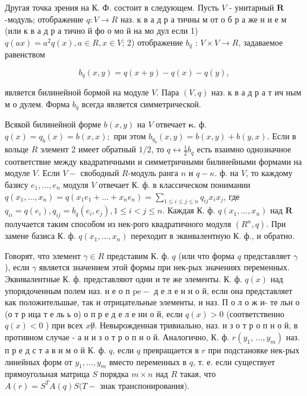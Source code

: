 \documentclass[10pt]{article}
\begin{document}
Другая точка зрения на К. Ф. состоит в следующем. Пусть $V$ - унитарный $\boldsymbol{R}$-модуль; отображение $q: V \rightarrow R$ наз. к в а д р а тичны м от о б р а же н и е м (или к в а д р а тично й фо о мо й на мо дул если 1) $q(a x)=a^{2} q(x), a \in R, x \in V$; 2) отображение $b_{q}$ : $V \times V \rightarrow R$, задаваемое равенством



\[

b_{q}(x, y)=q(x+y)-q(x)-q(y),

\]



является билинейной бормой на модуле $V$. Пара $(V, q)$ наз. к в а д р а т ич ным м о дулем. Форма $b_{q}$ всегда является симметрической.



Всякой билинейной форме $b(x, y)$ на $V$ отвечает $\boldsymbol{\kappa}$. ф. $q(x)=q_{b}(x)=b(x, x) ;$ при этом $b_{q_{b}}(x, y)=b(x, y)+b(y, x)$. Если в кольце $R$ элемент 2 имеет обратный $1 / 2$, то $q \leftrightarrow \frac{1}{2} b_{q}$ есть взаимно однозначное соответствие между квадратичными и симметричными билинейными формами на модуле $V$. Если $V-$ свободный $R$-модуль ранга $n$ и $q-\kappa$. ф. на $V$, то каждому базису $e_{1}, \ldots, e_{n}$ модуля $V$ отвечает К. ф. в классическом понимании $q\left(x_{1}, \ldots, x_{n}\right)=q\left(x_{1} e_{1}+\ldots+x_{n} e_{n}\right)=\sum_{1 \leqslant i \leqslant j \leqslant n} q_{i j} x_{i} x_{j}$, где $q_{i i}=q\left(e_{i}\right), q_{i j}=b_{q}\left(e_{i}, e_{j}\right), 1 \leqslant i<j \leqslant n$. Каждая К. ф. $q\left(x_{1}, \ldots, x_{n}\right)$ над $\boldsymbol{R}$ получается таким способом из нек-рого квадратичного модуля $\left(R^{n}, q\right)$. При замене базиса $К$. ф. $q\left(x_{1}, \ldots, x_{n}\right)$ переходит в эквивалентную К. ф., и обратно.



Говорят, что элемент $\gamma \in R$ представим К. ф. $q$ (или что форма $q$ представляет $\gamma$ ), если $\gamma$ является значением этой формы при нек-рых значениях переменных. Эквивалентные К. ф. представляют одни и те же элементы. К. ф. $q(x)$ над упорядоченным полем наз. н е о п $\mathrm{p} \mathrm{e}-$ д е л е н н о й, если она представляет как положительшые, так и отрицательные элементы, и наз. П о л о ж и- те льн о (о т р ица т е ль ь о) о п р е д е л е нн о й, если $q(x)>0$ (соответственно $q(x)<0$ ) при всех $x \not 0$. Невырожденная тривиально, наз. и з о т р о п н о й, в противном случае - а н и з о т р о п н о й. Аналогично, К. ф. $r\left(y_{1}\right.$, $\left.\ldots, y_{m}\right)$ наз. п р е д с т а в и м о й К. ф. $q$, если $q$ превращается в $r$ при подстановке нек-рых линейных форм от $y_{1}, \ldots, y_{m}$ вместо переменных в $q$, т. е. если существует прямоугольная матрица $S$ порядка $m \times n$ над $R$ такая, что $A(r)=S^{T} A(q) S(T-$ знак транспонирования).
\end{document}
